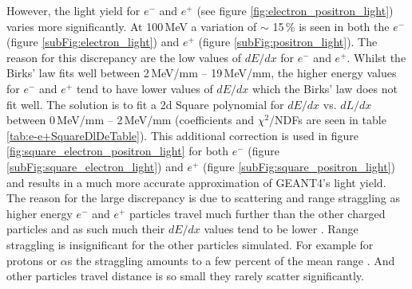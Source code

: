However, the light yield for $e^-$ and $e^+$ (see figure \ref{fig:electron_positron_light}) varies more significantly. At 100\,MeV a variation of $\sim$ 15\,\% is seen in both the $e^-$ (figure \ref{subFig:electron_light}) and $e^+$ (figure \ref{subFig:positron_light}). The reason for this discrepancy are the low values of $dE/dx$ for $e^-$ and $e^+$. Whilst the Birks' law fits well between 2\,MeV/mm -- 19\,MeV/mm, the higher energy values for $e^-$ and $e^+$ tend to have lower values of $dE/dx$ which the Birks' law does not fit well. The solution is to fit a 2d Square polynomial for $dE/dx$ vs. $dL/dx$ between 0\,MeV/mm -- 2\,MeV/mm (coefficients and $\chi^2$/NDFs are seen in table \ref{tab:e-e+SquareDlDeTable}). This additional correction is used in figure \ref{fig:square_electron_positron_light} for both $e^-$ (figure \ref{subFig:square_electron_light}) and $e^+$ (figure \ref{subFig:square_positron_light}) and results in a much more accurate approximation of GEANT4's light yield. The reason for the large discrepancy is due to scattering and range straggling as higher energy $e^-$ and $e^+$ particles travel much further than the other charged particles and as such much their $dE/dx$ values tend to be lower \cite{knoll_2010}. Range straggling is insignificant for the other particles simulated. For example for protons or $\alpha$s the straggling amounts to a few percent of the mean range \cite{knoll_2010}. And other particles travel distance is so small they rarely scatter significantly. 
